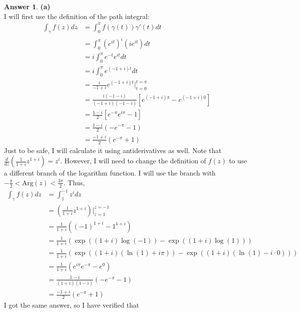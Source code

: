 \documentclass[10pt,a4paper]{article}
\theoremstyle{definition}
\newtheorem*{answer*}{Answer}
\begin{document}
\begin{answer*}{\textbf{(a)}}
\\I will first use the definition of the path integral:
\begin{align*}
\int_{\gamma} f(z)dz &= \int_0^{\pi} f(\gamma(t))\gamma'(t)dt\\
&= \int_0^{\pi} \left(e^{it}\right)^i (ie^{it})dt\\
&= i\int_0^{\pi} e^{-t}e^{it} dt\\
&= i\int_0^{\pi} e^{(-1 + i)t} dt\\
&= \frac{i}{-1 + i}e^{(-1 + i)t} \Big|_{t = 0}^{t = \pi}\\
&= \frac{i(-1-i)}{(-1 + i)(-1-i)}\left[e^{(-1 + i)\pi} - e^{(-1 + i)0}\right]\\
&= \frac{1 - i}{2} \left[e^{-\pi}e^{i\pi} - 1\right]\\
&= \frac{1 - i}{2}(-e^{-\pi} - 1)\\
&= \frac{-1 + i}{2}(e^{-\pi} + 1)
\end{align*}
Just to be safe, I will calculate it using antiderivatives as well. Note that $\displaystyle \frac{d}{dz}\left(\frac{1}{1 + i}z^{1 + i}\right) = z^i$. However, I will need to change the definition of $f(z)$ to use a different branch of the logarithm function. I will use the branch with $-\frac{\pi}{2} < \text{Arg}(z) < \frac{3\pi}{2}$. Thus, 
\begin{align*}
\int_{\gamma} f(z) dz &= \int_1^{-1} z^i dz\\
&= \left(\frac{1}{1 + i}z^{1 + i}\right) \Big|_{z = 1}^{z = -1}\\
&= \frac{1}{1 + i}\left((-1)^{1 + i} - 1^{1 + i}\right)\\
&= \frac{1}{1 + i}\left( \exp((1 + i)\log(-1)) - \exp((1 + i)\log(1))  \right)\\
&= \frac{1}{1 + i}\left(\exp((1 + i)(\ln(1) + i\pi)) - \exp((1 + i)(\ln(1) - i\cdot 0))\right)\\
&= \frac{1}{1 + i}\left(e^{i\pi}e^{-\pi} - e^0\right)\\
&= \frac{1 - i}{(1 + i)(1 - i)}\left(-e^{-\pi} - 1\right)\\
&= \frac{-1 + i}{2}(e^{-\pi} + 1)
\end{align*}
I got the same answer, so I have verified that 
\end{answer*}
\end{document}
